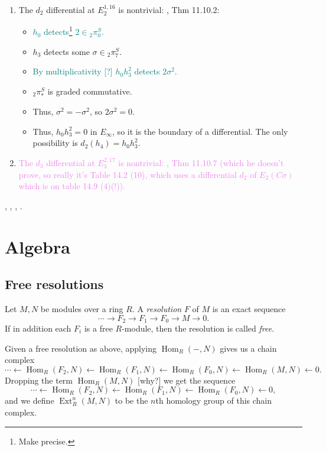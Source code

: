 \documentclass{MetricNotes2023}
\DeclareMathOperator{\Ext}{Ext}
\DeclareMathOperator{\Hom}{Hom}
\def\textcolour{\textcolor}
\begin{document}
\begin{enumerate}
\item The \(d_2\) differential at \(E^{1, 16}_2\) is nontrivial: \autocite{rognes2}, Thm 11.10.2:
\begin{itemize}
\item \textcolour{teal}{\(h_0\) detects\footnote{Make precise.} \(2 \in \text{}_2\pi^S_0\).}
\item \(h_3\) detects some \(\sigma \in \text{}_2\pi^S_7\).
\item \textcolour{teal}{By multiplicativity [?] \(h_0h_3^2\) detects \(2 \sigma^2\). }
\item \(\text{}_2\pi_*^S\) is graded commutative.
\item Thus, \(\sigma^2=-\sigma^2\), so \(2 \sigma^2=0\).
\item Thus, \(h_0h_3^2=0\) in \(E_\infty\), so it is the boundary of a differential. The only possibility is \(d_2(h_4)=h_0h_3^2\). 
\end{itemize}
\item \textcolour{violet}{The \(d_3\) differential at \(E^{2, 17}_3\) is nontrivial: \autocite{rognes2}, Thm 11.10.7 (which he doesn't prove, so really it's \autocite{rognes2} Table 14.2 (10), which uses a differential \(d_2\) of \(E_2(C\sigma)\) which is on table 14.9 (4)(!)).} 
\end{enumerate}

\autocite{stable_homotopy}, \autocite{cobordism}, \autocite{ass}, \autocite{rognes2}.

\appendix 

\section{Algebra}

\subsection{Free resolutions}\label{2502220958}

\begin{definition}
Let \(M, N\) be modules over a ring \(R\). A \textit{resolution} \(F\) of \(M\) is an exact sequence 
\[\cdots \to F_2 \to F_1 \to F_0 \to M \to 0.\]
If in addition each \(F_i\) is a free \(R\)-module, then the resolution is called \textit{free}. 
\end{definition}

Given a free resolution as above, applying \(\Hom_R(-, N)\) gives us a chain complex
\[\cdots \leftarrow \Hom_R(F_2, N) \leftarrow \Hom_R(F_1, N) \leftarrow \Hom_R(F_0, N) \leftarrow \Hom_R(M, N) \leftarrow 0.\]
Dropping the term \(\Hom_R(M, N)\) [why?] we get the sequence
\[\cdots \leftarrow \Hom_R(F_2, N) \leftarrow \Hom_R(F_1, N) \leftarrow \Hom_R(F_0, N) \leftarrow 0,\]
and we define \(\Ext^n_R(M, N)\) to be the \(n\)th homology group of this chain complex. 
\end{document}
